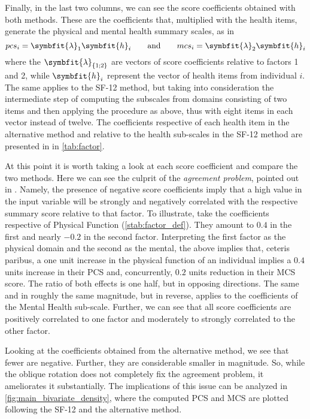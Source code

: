 Finally, in the last two columns, we can see the score coefficients obtained with both methods. These are the
coefficients that, multiplied with the health items, generate the physical and mental health summary scales, as in%
%
%
\begin{equation}
pcs_i  =  \symbfit{\lambda}_1 \symbfit{h}_{i} \qquad  \text{and} \qquad 
mcs_i  =  \symbfit{\lambda}_2 \symbfit{h}_{i} 
\end{equation}
where the $\symbfit{\lambda}_{\{1;2\}}$ are vectors of score coefficients relative to factors 1 and  2, while 
$\symbfit{h}_{i}$ represent the vector of health items from individual $i$. 
%
The same applies to the SF-12 method, but taking into consideration the intermediate step of computing the
subscales from domains consisting of two items and then applying the procedure as above, thus with eight
items in each vector instead of twelve.
%
The coefficients respective of each health item in the alternative method and relative to the health sub-scales in the SF-12
method are presented in in \cref{tab:factor}.



At this point it is worth taking a look at each score coefficient and compare the two methods. Here we can see
the culprit of the \textit{agreement problem}, pointed out in \textcite{tucker.etal2013observed}. Namely, the presence
of negative score coefficients imply that a high value in the input variable will be strongly and negatively
correlated with the respective summary score relative to that factor. To illustrate, take the coefficients respective
of Physical Function (\cref{stab:factor_def}). They amount to $0.4$ in the first and nearly $-0.2$ in
the second factor. Interpreting the first factor as the physical domain and the second as the mental, the above implies 
 that, ceteris paribus, a one unit increase in the physical function of
an individual implies a $0.4$ units increase in their PCS and, concurrently, $0.2$ units reduction in
their MCS score. The ratio of both effects is one half, but in opposing directions. The same and in roughly the 
same magnitude, but in reverse, applies to the coefficients of the Mental Health sub-scale. Further, we can see
that all score coefficients are positively correlated to one factor and moderately to strongly correlated to the
other factor.

Looking at the coefficients obtained from the alternative method, we see that fewer are negative. Further, they are
considerable smaller in magnitude. So, while the oblique rotation does not completely fix the agreement problem, it
ameliorates it substantially. The implications of this issue can be analyzed in \cref{fig:main_bivariate_density},
where the computed PCS and MCS are plotted following the SF-12 and the alternative method.

